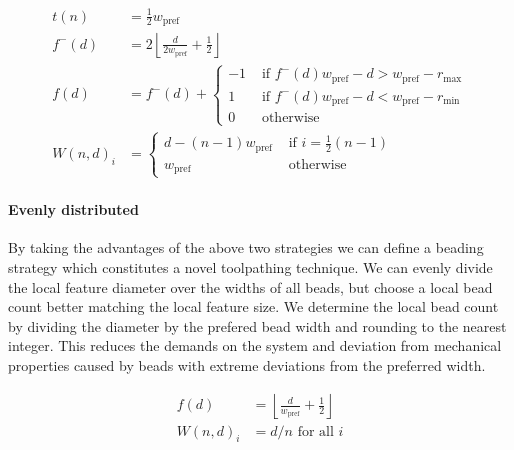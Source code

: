 \begin{align*}
t(n) &= \frac12 w_\text{pref} \\
f^-(d) &= 2 \left\lfloor \frac{d}{ 2w_\text{pref}} + \frac12 \right\rfloor \\
f(d) &= f^-(d) +
\begin{cases}
-1 & \text{ if } f^-(d) w_\text{pref} - d > w_\text{pref} - r_\text{max} \\
1  & \text{ if }  f^-(d) w_\text{pref} - d < w_\text{pref} - r_\text{min} \\
0 & \text{ otherwise}
\end{cases}
\\
W(n,d)_i &= 
\begin{cases}
d - (n-1) w_\text{pref} &\text{ if } i = \frac12 (n-1) \\
w_\text{pref} &\text{ otherwise }
\end{cases}
\end{align*}





\paragraph{Evenly distributed}
By taking the advantages of the above two strategies we can define a beading strategy which constitutes a novel toolpathing technique.
We can evenly divide the local feature diameter over the widths of all beads, but choose a local bead count better matching the local feature size.
We determine the local bead count by dividing the diameter by the prefered bead width and rounding to the nearest integer.
This reduces the demands on the system and deviation from mechanical properties caused by beads with extreme deviations from the preferred width.



\begin{align*}
f(d) &= \left\lfloor \frac{d}{ w_\text{pref}} + \frac12 \right\rfloor \\
W(n,d)_i &= d / n \text{ for all } i 
\end{align*}




